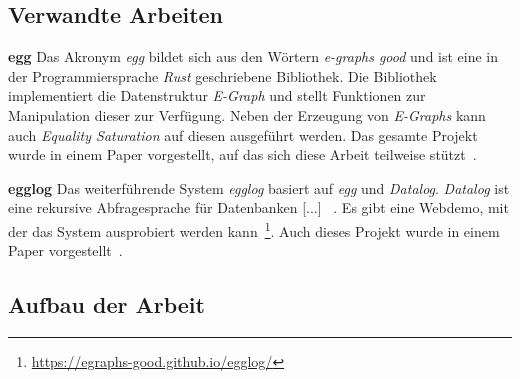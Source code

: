 





\subsection{Verwandte Arbeiten}\label{sub:verwandtearbeiten}

\noindent\textbf{egg} Das Akronym \textit{egg} bildet sich aus den Wörtern \textit{e-graphs good} und ist eine in der Programmiersprache \textit{Rust} geschriebene Bibliothek.
Die Bibliothek implementiert die Datenstruktur \textit{E-Graph} und stellt Funktionen zur Manipulation dieser zur Verfügung.
Neben der Erzeugung von \textit{E-Graphs} kann auch \textit{Equality Saturation} auf diesen ausgeführt werden.
Das gesamte Projekt wurde in einem Paper vorgestellt, auf das sich diese Arbeit teilweise stützt~\cite{2021-egg}.

\noindent\textbf{egglog} Das weiterführende System \textit{egglog} basiert auf \textit{egg} und \textit{Datalog}. 
\textit{Datalog} ist eine \glqq [...] rekursive Abfragesprache für Datenbanken [...] \grqq~\cite{2023-egglog}.
Es gibt eine Webdemo, mit der das System ausprobiert werden kann~\footnote{\hspace{1.5mm}\url{https://egraphs-good.github.io/egglog/}}.
Auch dieses Projekt wurde in einem Paper vorgestellt~\cite{2023-egglog}.


\subsection{Aufbau der Arbeit}

